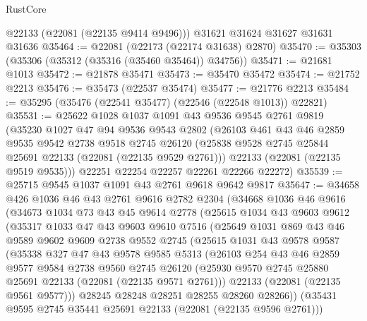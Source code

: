 \begin{lexlean}{RustCore}
\begin{coremodule}
      @22133
      (@22081 (@22135 @9414 @9496)))
    @31621
    @31624
    @31627
    @31631
    @31636
@35464 := @22081 (@22173 (@22174 @31638) @2870)
@35470 := @35303 (@35306 (@35312 (@35316 (@35460 @35464)) @34756))
@35471 := @21681 @1013
@35472 := @21878 @35471
@35473 := @35470 @35472
@35474 := @21752 @2213
@35476 := @35473 (@22537 @35474)
@35477 := @21776 @2213
@35484 := @35295 (@35476 (@22541 @35477) (@22546 (@22548 @1013)) @22821)
@35531 := @25622
    @1028
    @1037
    @1091
    @43
    @9536
    @9545
    @2761
    @9819
    (@35230
      @1027
      @47
      @94
      @9536
      @9543
      @2802
      (@26103
        @461
        @43
        @46
        @2859
        @9535
        @9542
        @2738
        @9518
        @2745
        @26120
        (@25838 @9528 @2745 @25844 @25691 @22133 (@22081 (@22135 @9529 @2761)))
        @22133
        (@22081 (@22135 @9519 @9535)))
      @22251
      @22254
      @22257
      @22261
      @22266
      @22272)
@35539 := @25715 @9545 @1037 @1091 @43 @2761 @9618 @9642 @9817
@35647 := @34658
    @426
    @1036
    @46
    @43
    @2761
    @9616
    @2782
    @2304
    (@34668
      @1036
      @46
      @9616
      (@34673
        @1034
        @73
        @43
        @45
        @9614
        @2778
        (@25615
          @1034
          @43
          @9603
          @9612
          (@35317
            @1033
            @47
            @43
            @9603
            @9610
            @7516
            (@25649
              @1031
              @869
              @43
              @46
              @9589
              @9602
              @9609
              @2738
              @9552
              @2745
              (@25615
                @1031
                @43
                @9578
                @9587
                (@35338
                  @327
                  @47
                  @43
                  @9578
                  @9585
                  @5313
                  (@26103
                    @254
                    @43
                    @46
                    @2859
                    @9577
                    @9584
                    @2738
                    @9560
                    @2745
                    @26120
                    (@25930 @9570 @2745 @25880 @25691 @22133 (@22081 (@22135 @9571 @2761)))
                    @22133
                    (@22081 (@22135 @9561 @9577)))
                  @28245
                  @28248
                  @28251
                  @28255
                  @28260
                  @28266))
              (@35431 @9595 @2745 @35441 @25691 @22133 (@22081 (@22135 @9596 @2761)))

\end{coremodule}
\end{lexlean}
